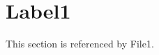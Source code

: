 \documentclass{article}
\begin{document}
\section{Label1}
\label{label1}

This section is referenced by File1.
\end{document}
